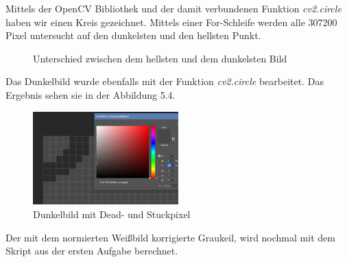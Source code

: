 \documentclass[12pt, oneside, a4paper, \docLanguage]{report}
\begin{document}
Mittels der OpenCV Bibliothek und der damit verbundenen Funktion \textit{cv2.circle} haben wir einen Kreis gezeichnet.
Mittels einer For-Schleife werden alle 307200 Pixel untersucht auf den dunkelsten und den hellsten Punkt. 
\begin{figure}[hbt!]
  	\centering
	\hfill
	\caption{Unterschied zwischen dem hellsten und dem dunkelsten Bild}
\end{figure}
Das Dunkelbild wurde ebenfalls mit der Funktion \textit{cv2.circle} bearbeitet. Das Ergebnis sehen sie in der Abbildung 5.4.
\begin{figure}[hbt!]
	\centering\small
	\includegraphics[width=0.5\textwidth]{../data/proof3.png}
	\caption{Dunkelbild mit Dead- und Stuckpixel}
	\label{fig:Dunkelbild mit Dead- und Stuckpixel}
\end{figure}
\newpage
Der mit dem normierten Weißbild korrigierte Graukeil, wird nochmal mit dem Skript aus der ersten Aufgabe berechnet.
\end{document}
